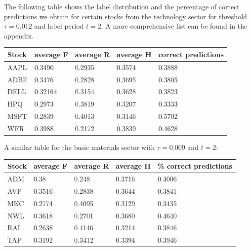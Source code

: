 \documentclass[10pt]{article}
\begin{document}
The following table shows the label distribution and the percentage of correct predictions we obtain for certain stocks from the technology sector for threshold $\tau = 0.012$ and label period $t=2$. A more comprehensive list can be found in the appendix.
\begin{center}
\begin{tabular}{| l | l | l | l | l |}
\hline
Stock & average F & average R & average H & correct predictions\\
\hline
  AAPL & 0.3490 & 0.2935 & 0.3574 & 0.3888\\
\hline
  ADBE & 0.3476 & 0.2828 & 0.3695 & 0.3805 \\
\hline 
DELL & 0.32164 & 0.3154 & 0.3628 & 0.3823\\
\hline
  HPQ & 0.2973 & 0.3819 & 0.3207 & 0.3333 \\
\hline
MSFT & 0.2839 & 0.4013 & 0.3146 & 0.5702\\
\hline
WFR & 0.3988 & 0.2172 & 0.3839 & 0.4628\\
\hline
\end{tabular}
\end{center}

A similar table for the basic materials sector with $\tau = 0.009$ and $t=2$:
\begin{center}
\begin{tabular}{| l | l | l | l | l |}
\hline
Stock & average F & average R & average H & \% correct predictions\\
\hline
ADM & 0.38 & 0.248 & 0.3716 & 0.4006\\
\hline
AVP & 0.3516 & 0.2838 & 0.3644 & 0.3841\\
\hline
MKC & 0.2774 & 0.4095 & 0.3129 & 0.3435\\
\hline
NWL & 0.3618 & 0.2701 & 0.3680 & 0.4640\\
\hline
RAI & 0.2638 & 0.4146 & 0.3214 & 0.3846\\
\hline
TAP & 0.3192 & 0.3412 & 0.3394 & 0.3946\\
\hline
\end{tabular}
\end{center}
\end{document}
